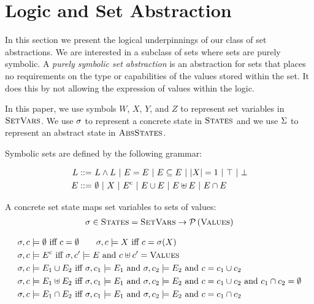 \section{Logic and Set Abstraction}
\label{sec:logic-and-set-abstraction}

In this section we present the logical underpinnings of our class of set abstractions.  We are interested in a subclass of sets where sets are purely symbolic.  A \emph{purely symbolic set abstraction} is an abstraction for sets that places no requirements on the type or capabilities of the values stored within the set.  It does this by not allowing the expression of values within the logic.

In this paper, we use symbols $W$, $X$, $Y$, and $Z$ to represent set variables in $\textsc{SetVars}$.  We use $\sigma$ to represent a concrete state in $\textsc{States}$ and we use $\Sigma$ to represent an abstract state in $\textsc{AbsStates}$.

\begin{definition}
    Symbolic sets are defined by the following grammar:
    
    \begin{align*}
        L ::= & \ L \wedge L \ | \ E = E \ | \ E \subseteq E \ | \ \card{X} = 1 \ | \ \top \ | \ \bot \\
        E ::= & \ \emptyset \ | \ X \ | \ \comp{E} \ | \ E \cup E \ | \ E \uplus E \ | \ E \cap E
    \end{align*}
\end{definition}

\begin{definition}
    A concrete set state maps set variables to sets of values:
    \begin{align*}
        \sigma \in \textsc{States} = \textsc{SetVars} \rightarrow \mathcal{P}\left({\textsc{Values}}\right)
    \end{align*}
\end{definition}

\begin{align*}
  & \sigma, c \models \emptyset \textrm{ iff } c = \emptyset \qquad \sigma, c \models X \textrm{ iff } c = \sigma(X) \\
  & \sigma, c \models {E}^{\mathrm{c}} \textrm{ iff } \sigma, c' \models{E} \textrm{ and } c \uplus c' = \textsc{Values} \\
  & \sigma, c \models E_1 \cup E_2 \textrm{ iff } \sigma, c_1 \models E_1 \textrm{ and } \sigma, c_2 \models E_2 \textrm{ and } c = c_1 \cup c_2 \\
  & \sigma, c \models E_1 \uplus E_2 \textrm{ iff } \sigma, c_1 \models E_1 \textrm{ and } \sigma, c_2 \models E_2 \textrm{ and } c = c_1 \cup c_2 \textrm{ and } c_1 \cap c_2 = \emptyset \\
  & \sigma, c \models E_1 \cap E_2 \textrm{ iff } \sigma, c_1 \models E_1 \textrm{ and } \sigma, c_2 \models E_2 \textrm{ and } c = c_1 \cap c_2
\end{align*}

